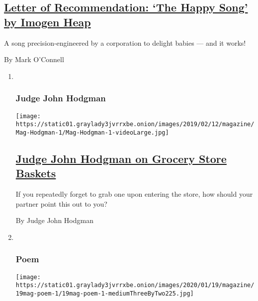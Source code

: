 \begin{enumerate}
  \hypertarget{letter-of-recommendation-the-happy-song-by-imogen-heap}{%
  \subsection{\texorpdfstring{\href{/2020/01/14/magazine/the-happy-song-imogen-heap.html}{Letter
  of Recommendation: `The Happy Song' by Imogen
  Heap}}{Letter of Recommendation: `The Happy Song' by Imogen Heap}}\label{letter-of-recommendation-the-happy-song-by-imogen-heap}}

  A song precision-engineered by a corporation to delight babies --- and
  it works!

  By Mark O'Connell
\end{enumerate}

\begin{enumerate}
\def\labelenumi{\arabic{enumi}.}
\item ~
  \hypertarget{judge-john-hodgman}{%
  \subsubsection{Judge John Hodgman}\label{judge-john-hodgman}}

  \texttt{[image: https://static01.graylady3jvrrxbe.onion/images/2019/02/12/magazine/Mag-Hodgman-1/Mag-Hodgman-1-videoLarge.jpg]}

  \hypertarget{judge-john-hodgman-on-grocery-store-baskets}{%
  \subsection{\texorpdfstring{\href{/2020/01/16/magazine/judge-john-hodgman-on-grocery-store-baskets.html}{Judge
  John Hodgman on Grocery Store
  Baskets}}{Judge John Hodgman on Grocery Store Baskets}}\label{judge-john-hodgman-on-grocery-store-baskets}}

  If you repeatedly forget to grab one upon entering the store, how
  should your partner point this out to you?

  By Judge John Hodgman
\item ~
  \hypertarget{poem}{%
  \subsubsection{Poem}\label{poem}}

  \texttt{[image: https://static01.graylady3jvrrxbe.onion/images/2020/01/19/magazine/19mag-poem-1/19mag-poem-1-mediumThreeByTwo225.jpg]}

  \hypertarget{poem-return-to-nushagak}{%
}
\end{enumerate}
